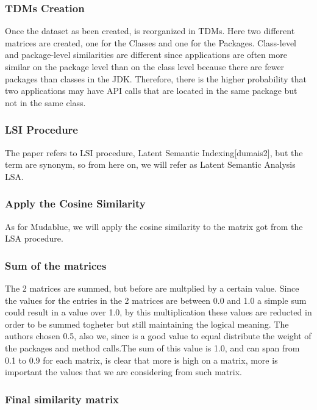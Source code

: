 \subsubsection{TDMs Creation}
Once the dataset as been created, is reorganized in TDMs. Here two different matrices are created, one for the Classes and one for the Packages. Class-level and package-level similarities are different since applications are often more similar on the package level than on the class level because there are fewer packages than classes in the JDK. Therefore, there is the higher probability that two applications may have API calls that are located in the same package but not in the same class.

\subsubsection{LSI Procedure}
The paper refers to LSI procedure, Latent Semantic Indexing[dumais2], but the term are synonym, so from here on, we will refer as Latent Semantic Analysis LSA.

\subsubsection{Apply the Cosine Similarity}
As for Mudablue, we will apply the cosine similarity to the matrix got from the LSA procedure.

\subsubsection{Sum of the matrices}
The 2 matrices are summed, but before are multplied by a certain value. Since the values for the entries in the 2 matrices are between 0.0 and 1.0 a simple sum could result in a value over 1.0, by this multiplication these values are reducted in order to be summed togheter but still maintaining the logical meaning. The authors chosen 0.5, also we, since is a good value to equal distribute the weight of the packages and method calls.The sum of this value is 1.0, and can span from 0.1 to 0.9 for each matrix, is clear that more is high on a matrix, more is important the values that we are considering from such matrix.

\subsubsection{Final similarity matrix}
\clearpage



